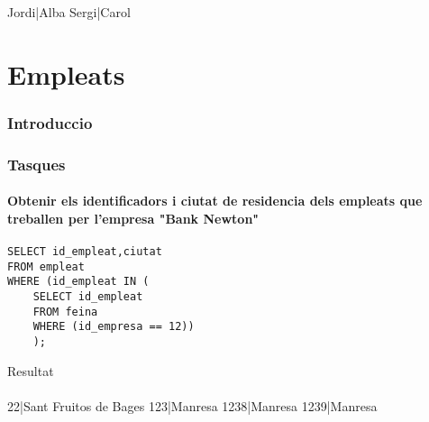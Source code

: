 \documentclass[11p]{article}
\begin{document}
Jordi|Alba
Sergi|Carol



\part{Empleats}

\section{Introduccio}

\section{Tasques}

\subsection{Obtenir els identificadors i ciutat de residencia dels empleats que treballen per l'empresa "Bank Newton"} 
\begin{lstlisting}
SELECT id_empleat,ciutat 
FROM empleat 
WHERE (id_empleat IN (
	SELECT id_empleat 
	FROM feina 
	WHERE (id_empresa == 12))
	);
\end{lstlisting}

Resultat\\\\
22|Sant Fruitos de Bages
123|Manresa
1238|Manresa
1239|Manresa
\end{document}
